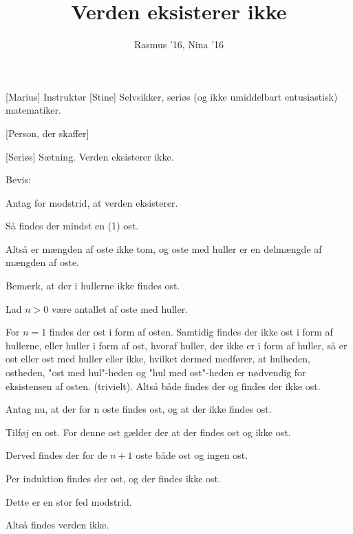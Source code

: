 \documentclass[a4paper,11pt]{article}
\title{Verden eksisterer ikke}
\author{Rasmus ’16, Nina ’16}
\begin{document}
\maketitle

\begin{roles}
[Marius] Instruktør
[Stine] Selvsikker, seriøs (og ikke umiddelbart entusiastisk) matematiker.
\end{roles}

\begin{props}
[Person, der skaffer]
\end{props}


\begin{sketch}

[Seriøs] Sætning. Verden eksisterer ikke.

 Bevis:

 Antag for modstrid, at verden eksisterer. 

 Så findes der mindst en (1) ost.

 Altså er mængden af oste ikke tom, og oste med huller er en delmængde af mængden af oste.

 Bemærk, at der i hullerne ikke findes ost.

 Lad $n > 0$ være antallet af oste med huller.

 For $n = 1$ findes der ost i form af osten. Samtidig findes der ikke ost i form af hullerne, eller huller i form af ost, hvoraf huller, der ikke er i form af huller, så er ost eller ost med huller eller ikke, hvilket dermed medfører, at hulheden, ostheden, "ost med hul"-heden og "hul med ost"-heden er nødvendig for eksistensen af osten. (trivielt). Altså både findes der og findes der ikke ost.

 Antag nu, at der for n oste findes ost, og at der ikke findes ost.

 Tilføj en ost. For denne ost gælder der at der findes ost og ikke ost.

 Derved findes der for de $n + 1$ oste både ost og ingen ost.

 Per induktion findes der ost, og der findes ikke ost.

 Dette er en stor fed modstrid.

 Altså findes verden ikke. 

\end{sketch}
\end{document}
